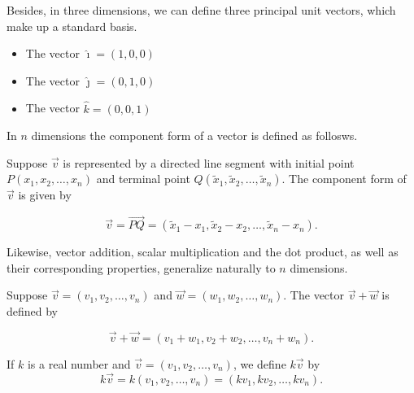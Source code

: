 Besides, in three dimensions, we can define three principal unit vectors, which make up a standard basis. 
 

\begin{itemize}

\item The vector $\hat{\imath} = \left(1,0,0\right)$

\item The vector $\hat{\jmath} = \left(0,1,0\right)$

\item The vector $\hat{k} = \left(0,0,1\right)$

\end{itemize}


\fi 


\ifanalysis

In $n$ dimensions the component form of a vector is defined as follosws. 
\begin{definition} \label{componentformvectornd}  Suppose $\vec{v}$ is represented by a directed line segment with initial point $P\left(x_{1}, x_{2},\ldots, x_{n}\right)$ and terminal point $Q\left(\widetilde{x}_{1}, \widetilde{x}_{2},\ldots, \widetilde{x}_{n}\right)$.  The component form of $\vec{v}$ is given by 

\[ \vec{v} = \overrightarrow{PQ} = \left(\widetilde{x}_1- x_1 , \widetilde{x}_2-x_2, \ldots, \widetilde{x}_n-x_n \right). \]


\end{definition}

Likewise, vector addition, scalar multiplication and the dot product, as well as their corresponding properties, generalize naturally to $n$ dimensions.

\begin{definition} \label{vectoraddnd} 
 Suppose $\vec{v} = \left(v_1,v_2,\ldots,v_n\right)$ and $\vec{w} = \left(w_1,w_2,\ldots,w_n\right)$.  The vector $\vec{v} + \vec{w}$ is defined by 

\[ \vec{v} + \vec{w}  = \left( v_1 + w_1, v_2 + w_2, \ldots, v_n+ w_n\right). \]


\end{definition}


\begin{definition} \label{scalarmultvectornd}    If $k$ is a real number and $\vec{v} = \left(v_1,v_2,\ldots,v_n\right)$, we define $k\vec{v}$ by 
\[k\vec{v} = k\left(v_1,v_2,\ldots,v_n\right) =\left(k v_1,k v_2, \ldots, k v_n\right). \]

\end{definition}


